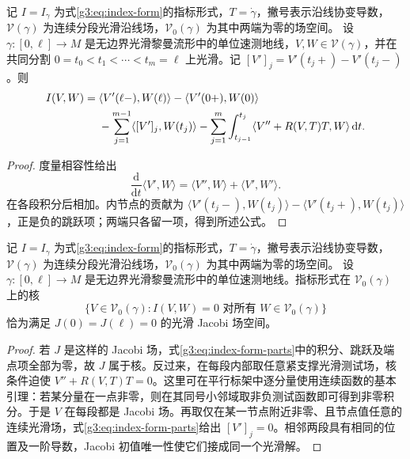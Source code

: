 \begin{proposition}\label{g3:prop:index-form-integration-by-parts}
	记 \(I=I_\gamma\) 为式\eqref{g3:eq:index-form}的指标形式，\(T=\dot\gamma\)，撇号表示沿线协变导数，\(\mathcal V(\gamma)\) 为连续分段光滑沿线场，\(\mathcal V_0(\gamma)\) 为其中两端为零的场空间。
	设 \(\gamma:[0,\ell]\to M\) 是无边界光滑黎曼流形中的单位速测地线，\(V,W\in\mathcal V(\gamma)\)，并在共同分割
	\(0=t_0<t_1<\cdots<t_m=\ell\) 上光滑。记
	\([V']_j=V'(t_j+)-V'(t_j-)\)。则
	\begin{align}
		I(V,W)
		={}&\langle V'(\ell-),W(\ell)\rangle
			-\langle V'(0+),W(0)\rangle \notag\\
		&-\sum_{j=1}^{m-1}\langle[V']_j,W(t_j)\rangle
			-\sum_{j=1}^m\int_{t_{j-1}}^{t_j}
			\langle V''+R(V,T)T,W\rangle\,\mathrm dt .
		\label{g3:eq:index-form-parts}
	\end{align}
\end{proposition}
\begin{proof}
	度量相容性给出
	\[
		\frac{\mathrm d}{\mathrm dt}\langle V',W\rangle
		=\langle V'',W\rangle+\langle V',W'\rangle.
	\]
	在各段积分后相加。内节点的贡献为
	\(\langle V'(t_j-),W(t_j)\rangle-
	\langle V'(t_j+),W(t_j)\rangle\)，正是负的跳跃项；两端只各留一项，得到所述公式。
\end{proof}

\begin{proposition}\label{g3:prop:index-form-kernel}
	记 \(I=I_\gamma\) 为式\eqref{g3:eq:index-form}的指标形式，\(T=\dot\gamma\)，撇号表示沿线协变导数，\(\mathcal V(\gamma)\) 为连续分段光滑沿线场，\(\mathcal V_0(\gamma)\) 为其中两端为零的场空间。
	设 \(\gamma:[0,\ell]\to M\) 是无边界光滑黎曼流形中的单位速测地线。指标形式在 \(\mathcal V_0(\gamma)\) 上的核
	\[
		\{V\in\mathcal V_0(\gamma):I(V,W)=0
		\text{ 对所有 }W\in\mathcal V_0(\gamma)\}
	\]
	恰为满足 \(J(0)=J(\ell)=0\) 的光滑 Jacobi 场空间。
\end{proposition}
\begin{proof}
	若 \(J\) 是这样的 Jacobi 场，式\eqref{g3:eq:index-form-parts}中的积分、跳跃及端点项全部为零，故 \(J\) 属于核。反过来，在每段内部取任意紧支撑光滑测试场，核条件迫使
	\(V''+R(V,T)T=0\)。这里可在平行标架中逐分量使用连续函数的基本引理：若某分量在一点非零，则在其同号小邻域取非负测试函数即可得到非零积分。于是 \(V\) 在每段都是 Jacobi 场。再取仅在某一节点附近非零、且节点值任意的连续光滑场，式\eqref{g3:eq:index-form-parts}给出 \([V']_j=0\)。相邻两段具有相同的位置及一阶导数，Jacobi 初值唯一性使它们接成同一个光滑解。
\end{proof}

